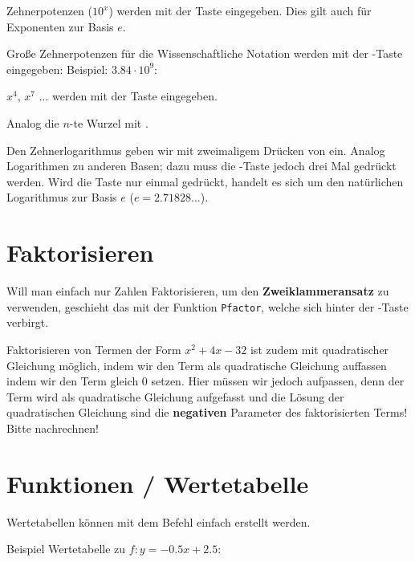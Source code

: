 Zehnerpotenzen ($10^x$) werden mit der Taste  eingegeben. Dies gilt auch für Exponenten zur Basis $e$.

Große Zehnerpotenzen\label{ee} für die Wissenschaftliche Notation werden mit der -Taste eingegeben: Beispiel: $3.84 \cdot{} 10^9$:\\

$x^4$, $x^7$ ... werden mit der Taste  eingegeben.

Analog die $n$-te Wurzel mit .

Den Zehnerlogarithmus geben wir mit zweimaligem Drücken
von   ein. Analog Logarithmen zu anderen
Basen; dazu muss die -Taste jedoch drei Mal gedrückt
werden.
Wird die Taste  nur einmal gedrückt, handelt es sich um
den natürlichen Logarithmus zur Basis $e$ ($e = 2.71828...$).



\section{Faktorisieren}\label{faktorisieren}


Will man einfach nur Zahlen Faktorisieren, \zB um den \textbf{Zweiklammeransatz} zu verwenden, geschieht das mit der Funktion \texttt{Pfactor}, welche sich hinter der -Taste verbirgt.

Faktorisieren von Termen der Form $x^2 +4x -32$ ist zudem mit
quadratischer Gleichung möglich, indem wir den Term als quadratische
Gleichung auffassen indem wir den Term gleich 0 setzen. Hier müssen wir jedoch aufpassen, denn der Term wird als quadratische Gleichung aufgefasst und die Lösung der quadratischen Gleichung sind die \textbf{negativen} Parameter des faktorisierten Terms! Bitte nachrechnen!
\newpage

\section{Funktionen / Wertetabelle}\label{wertetabelle}
Wertetabellen können mit dem Befehl  einfach erstellt
werden.

Beispiel Wertetabelle zu $f: y=-0.5x + 2.5$:


